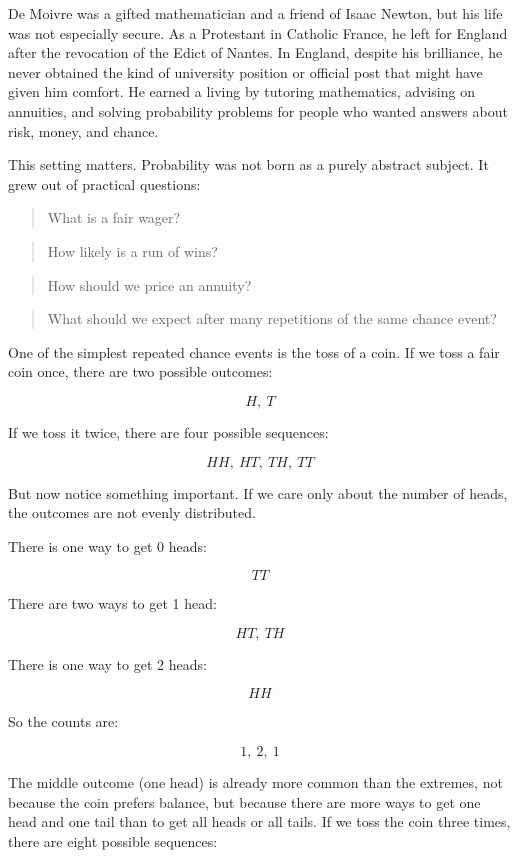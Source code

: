 \documentclass[
  letterpaper,
  DIV=11,
  numbers=noendperiod]{scrreprt}
\begin{document}
De Moivre was a gifted mathematician and a friend of Isaac Newton, but
his life was not especially secure. As a Protestant in Catholic France,
he left for England after the revocation of the Edict of Nantes. In
England, despite his brilliance, he never obtained the kind of
university position or official post that might have given him comfort.
He earned a living by tutoring mathematics, advising on annuities, and
solving probability problems for people who wanted answers about risk,
money, and chance.

This setting matters. Probability was not born as a purely abstract
subject. It grew out of practical questions:

\begin{quote}
What is a fair wager?
\end{quote}

\begin{quote}
How likely is a run of wins?
\end{quote}

\begin{quote}
How should we price an annuity?
\end{quote}

\begin{quote}
What should we expect after many repetitions of the same chance event?
\end{quote}

One of the simplest repeated chance events is the toss of a coin. If we
toss a fair coin once, there are two possible outcomes:

\[
H,\ T
\]

If we toss it twice, there are four possible sequences:

\[
HH,\ HT,\ TH,\ TT
\]

But now notice something important. If we care only about the number of
heads, the outcomes are not evenly distributed.

There is one way to get 0 heads:

\[
TT
\]

There are two ways to get 1 head:

\[
HT,\ TH
\]

There is one way to get 2 heads:

\[
HH
\]

So the counts are:

\[
1,\ 2,\ 1
\]

The middle outcome (one head) is already more common than the extremes,
not because the coin prefers balance, but because there are more ways to
get one head and one tail than to get all heads or all tails. If we toss
the coin three times, there are eight possible sequences:
\end{document}
